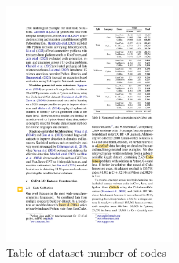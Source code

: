 \begin{figure}[ht]
    \centering
    \includegraphics[width=0.5\textwidth]{img/CoDet-M4/tab1.pdf}
    \caption{Table of dataset number of codes}
    \label{fig:tabella-risultati}
\end{figure}

